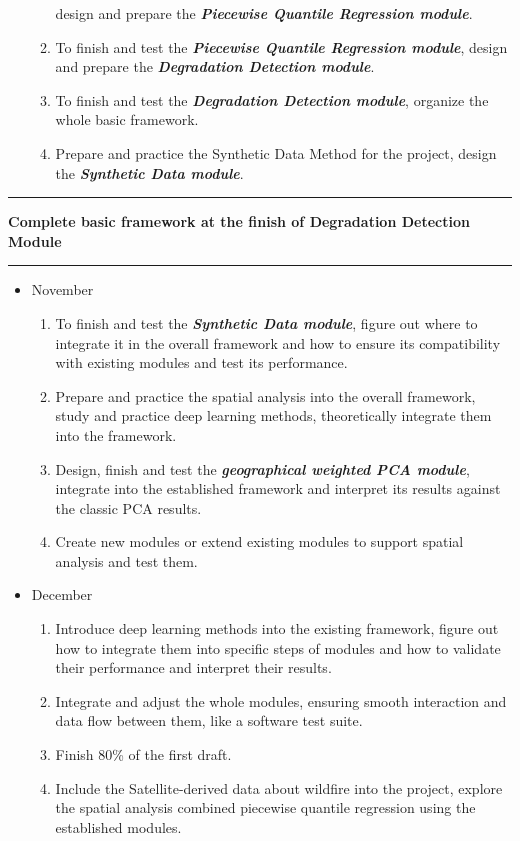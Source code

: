 \begin{itemize}
\begin{enumerate}
            design and prepare the \textbf{\textit{Piecewise Quantile Regression module}}.
            \item To finish and test the \textbf{\textit{Piecewise Quantile Regression module}},
            design and prepare the \textbf{\textit{Degradation Detection module}}.
            \item To finish and test the \textbf{\textit{Degradation Detection module}},
            organize the whole basic framework.
            \item Prepare and practice the Synthetic Data Method for the project,
            design the \textbf{\textit{Synthetic Data module}}. 
        \end{enumerate}
\end{itemize}

\noindent\rule{\textwidth}{0.4pt}
\centerline{\textbf{Complete basic framework at the finish of Degradation Detection Module}}
\noindent\rule{\textwidth}{0.4pt}

\begin{itemize}
    \item November
        \begin{enumerate}
            \item To finish and test the \textbf{\textit{Synthetic Data module}},
            figure out where to integrate it in the overall framework and
            how to ensure its compatibility with existing modules and test its performance.
            \item Prepare and practice the spatial analysis into the overall framework,
            study and practice deep learning methods, theoretically integrate them into the framework.
            \item Design, finish and test the \textbf{\textit{geographical weighted PCA module}},
            integrate into the established framework and interpret its results against the classic PCA results.
            \item Create new modules or extend existing modules to support spatial analysis and test them.
        \end{enumerate}
    \item December
        \begin{enumerate}
            \item Introduce deep learning methods into the existing framework,
            figure out how to integrate them into specific steps of modules and how to
            validate their performance and interpret their results.
            \item Integrate and adjust the whole modules, ensuring smooth interaction and data flow between them,
            like a software test suite.
            \item Finish 80\% of the first draft.
            \item Include the Satellite-derived data about wildfire into the project,
            explore the spatial analysis combined piecewise quantile regression using the
            established modules.
        \end{enumerate}
\end{itemize}

